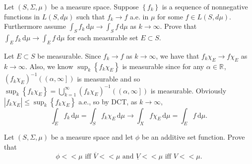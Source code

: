 \pagebreak

\begin{problem}{5}
  Let $\left( S, \Sigma, \mu \right)$ be a measure space.
  Suppose $\left\{ f_{k} \right\}$ is a sequence of nonnegative functions in $L\left( S, d \mu \right)$ such that $f_{k} \to f$ a.e. in $\mu$ for some $f\in L\left( S,d \mu \right)$.
  Furthermore assume $\int_{S} \! f_{k} \, \mathrm{d} \mu \to \int_{S} \! f \, \mathrm{d} \mu $ as $k \to \infty$.
  Prove that $\int_{E} \! f_{k} \, \mathrm{d} \mu \to \int_{E} \! f \, \mathrm{d} \mu  $ for each measurable set $E \subset S$.
\end{problem}

\begin{solution}
  Let $E \subset S$ be measurable.
  Since $f_{k} \to f$ as $k \to \infty$, we have that $f_{k} \chi_{E} \to f \chi_{E}$ as $k \to \infty$.
  Also, we know $\sup_{k}\left\{ f_{k} \chi_{E} \right\}$ is measurable since for any $\alpha \in \mathbb{R}^{}$, $\left( f_{k} \chi_{E} \right)^{-1}\left( \left( \alpha,\infty \right] \right)$ is measurable and so $\sup_{k}\left\{ f_{k} \chi_{E} \right\} = \bigcup_{k=1}^{\infty}  \left( f_{k} \chi_{E} \right)^{-1}\left( \left( \alpha,\infty \right] \right)$ is measurable. 
  Obviously $\left| f_{k} \chi_{E} \right| \leq \sup_{k}\left\{ f_{k} \chi_{E} \right\}$ a.e., so by DCT, as $k \to \infty$, 
  \[
  \int_{E} \! f_{k} \, \mathrm{d} \mu = \int_{S} \! f_{k} \chi_{E} \, \mathrm{d} \mu \to \int_{X} \! f \chi_{E} \, \mathrm{d} \mu = \int_{E} \! f \, \mathrm{d} \mu    
  .\] 
\end{solution}

\pagebreak

\begin{problem}{6}
  Let $\left( S, \Sigma, \mu \right)$ be a measure space and let $\phi$ be an additive set function.
  Prove that
  \[
  \phi < < \mu \text{ iff } \overline{V} < < \mu \text{ and } \underline{V} < < \mu \text{ iff } V < < \mu
  .\] 
\end{problem}

